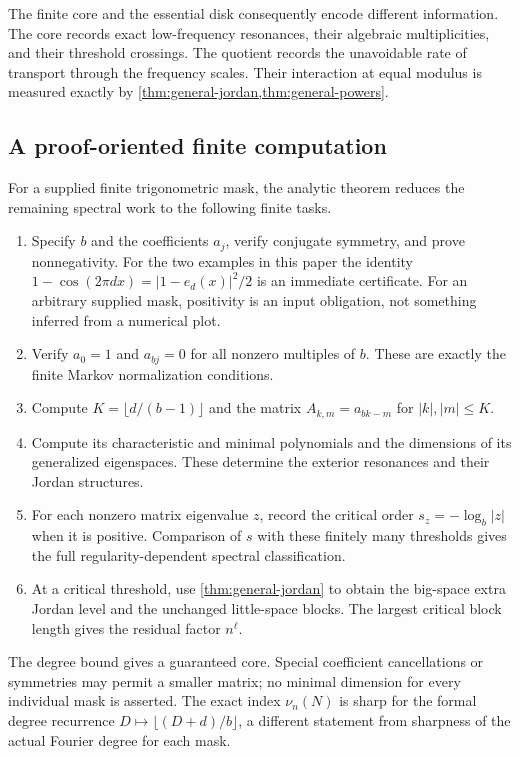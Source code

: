 \documentclass[11pt,a4paper]{article}
\numberwithin{equation}{section}
\theoremstyle{definition}
\theoremstyle{remark}
\begin{document}
The finite core and the essential disk consequently encode different
information. The core records exact low-frequency resonances, their
algebraic multiplicities, and their threshold crossings. The quotient
records the unavoidable rate of transport through the frequency
scales. Their interaction at equal modulus is measured exactly by
\cref{thm:general-jordan,thm:general-powers}.

\subsection{A proof-oriented finite computation}
For a supplied finite trigonometric mask, the analytic theorem reduces
the remaining spectral work to the following finite tasks.
\begin{enumerate}
\item Specify $b$ and the coefficients $a_j$, verify conjugate symmetry,
and prove nonnegativity. For the two examples in this paper the identity
$1-\cos(2\pi d x)=|1-e_d(x)|^2/2$ is an immediate certificate.
For an arbitrary supplied mask, positivity is an input obligation, not
something inferred from a numerical plot.
\item Verify $a_0=1$ and $a_{bj}=0$ for all nonzero multiples of $b$.
These are exactly the finite Markov normalization conditions.
\item Compute $K=\lfloor d/(b-1)\rfloor$ and the matrix
$A_{k,m}=a_{bk-m}$ for $|k|,|m|\le K$.
\item Compute its characteristic and minimal polynomials and the
dimensions of its generalized eigenspaces. These determine the exterior
resonances and their Jordan structures.
\item For each nonzero matrix eigenvalue $z$, record the critical order
$s_z=-\log_b|z|$ when it is positive. Comparison of $s$ with these
finitely many thresholds gives the full regularity-dependent spectral
classification.
\item At a critical threshold, use \cref{thm:general-jordan} to obtain
the big-space extra Jordan level and the unchanged little-space
blocks. The largest critical block length gives the residual factor
$n^\ell$.
\end{enumerate}
The degree bound gives a guaranteed core. Special coefficient
cancellations or symmetries may permit a smaller matrix; no minimal
dimension for every individual mask is asserted. The exact index
$\nu_n(N)$ is sharp for the formal degree recurrence
$D\mapsto\lfloor(D+d)/b\rfloor$, a different statement from sharpness
of the actual Fourier degree for each mask.
\end{document}
